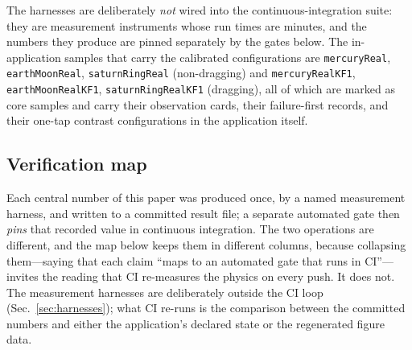 \documentclass[aps,reprint,amsmath,amssymb,nofootinbib,superscriptaddress,floatfix]{revtex4-2}
\begin{document}
The harnesses are deliberately \emph{not} wired into the
continuous-integration suite: they are measurement instruments whose
run times are minutes, and the numbers they produce are pinned
separately by the gates below.
The in-application samples that carry the calibrated configurations are
\texttt{mercuryReal}, \texttt{earthMoonReal}, \texttt{saturnRingReal}
(non-dragging) and \texttt{mercuryRealKF1},
\texttt{earthMoonRealKF1}, \texttt{saturnRingRealKF1} (dragging), all
of which are marked as core samples and carry their observation cards,
their failure-first records, and their one-tap contrast configurations
in the application itself.

\subsection{Verification map}
\label{sec:map}

Each central number of this paper was produced once, by a named
measurement harness, and written to a committed result file; a separate
automated gate then \emph{pins} that recorded value in continuous
integration.
The two operations are different, and the map below keeps them in
different columns, because collapsing them---saying that each claim
``maps to an automated gate that runs in CI''---invites the reading that
CI re-measures the physics on every push.
It does not.
The measurement harnesses are deliberately outside the CI loop
(Sec.~\ref{sec:harnesses}); what CI re-runs is the comparison between
the committed numbers and either the application's declared state or
the regenerated figure data.
\end{document}
